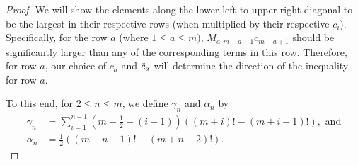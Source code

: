 \documentclass[12pt]{article}
\begin{document}
\begin{proof}
    
We will show the elements along the lower-left to upper-right diagonal to be the largest in their respective rows (when multiplied by their respective $c_i$). Specifically, for the row $a$ (where $1 \leq a \leq m)$, $M_{a,m-a+1}c_{m-a+1}$ should be significantly larger than any of the corresponding terms in this row. Therefore, for row $a$, our choice of $c_a$ and $\Tilde{c}_a$ will determine the direction of the inequality for row $a$.



To this end, for $2 \leq n \leq m$, we define $\gamma_n$ and $\alpha_n$ by
\begin{align*}
 \gamma_n&= \sum_{i=1}^{n-1}(m-\frac{1}{2} -(i-1)) ((
m+i)!-(m+i-1)!), \text{ and} \\\alpha_n &= \frac{1}{2}((m+n-1)!-(m+n-2)!).
\end{align*}


\end{proof}
\end{document}
